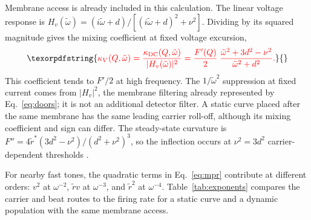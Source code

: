 \documentclass[11pt,a4paper]{article}
\providecommand{\DIFaddtex}[1]{{\protect\color{blue} \sf #1}} %
\providecommand{\DIFdeltex}[1]{{\protect\color{red} \scriptsize #1}} %
\providecommand{\DIFaddbegin}{} %
\providecommand{\DIFaddend}{} %
\providecommand{\DIFdelbegin}{} %
\providecommand{\DIFdelend}{} %
\providecommand{\DIFadd}[1]{\texorpdfstring{\DIFaddtex{#1}}{#1}} %
\providecommand{\DIFdel}[1]{\texorpdfstring{\DIFdeltex{#1}}{}} %
\begin{document}
\DIFdel{Membrane access is already included in this calculation. The linear voltage response
is $H_v(\tilde\omega)=(i\tilde\omega+d)/[(i\tilde\omega+d)^2+\nu^2]$. Dividing by its squared magnitude
gives the mixing coefficient at fixed voltage excursion,
}\begin{displaymath}
\DIFdel{\kappa_V(Q,\tilde\omega)=\frac{\kappa_{\rm DC}(Q,\tilde\omega)}{|H_v(\tilde\omega)|^2}
=\frac{F'(Q)}{2}\;\frac{\tilde\omega^2+3d^2-\nu^2}{\tilde\omega^2+d^2}.
}\end{displaymath}%
\DIFdel{This coefficient tends to $F'/2$ at high frequency. The $1/\tilde\omega^2$ suppression
at fixed current comes from $|H_v|^2$, the membrane filtering already represented
by Eq.~\eqref{eq:doors}; it is not an additional detector filter. A static curve
placed after the same membrane has the same leading carrier roll-off, although
its mixing coefficient and sign can differ. The steady-state curvature is
$F''=4\tilde r^*(3d^2-\nu^2)/(d^2+\nu^2)^3$, so the inflection occurs at $\nu^2=3d^2$}\DIFdelend \DIFaddbegin \DIFadd{carrier-dependent thresholds \cite{opancar2025,peripheral2023}}\DIFaddend .

\DIFdelbegin \DIFdel{For nearby fast tones, the quadratic terms in Eq.~\eqref{eq:mpr} contribute at
different orders: $v^2$ at $\omega^{-2}$, $\tilde r v$ at $\omega^{-3}$, and $\tilde r^2$ at
$\omega^{-4}$. Table~\ref{tab:exponents} compares the carrier and beat routes to
the firing rate for a static curve and a dynamic population with the same membrane access.
}%
\end{document}
